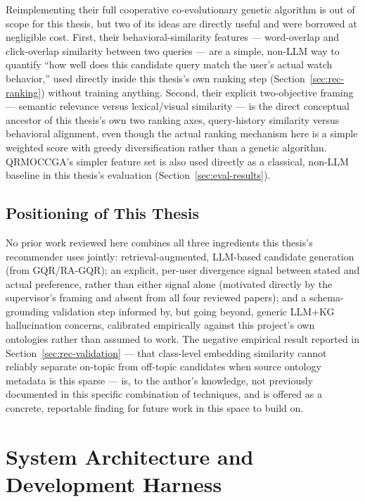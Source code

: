 \documentclass[11pt,a4paper,oneside]{book}
\begin{document}
Reimplementing their full cooperative co-evolutionary genetic algorithm is out of scope for this
thesis, but two of its ideas are directly useful and were borrowed at negligible cost. First, their
behavioral-similarity features --- word-overlap and click-overlap similarity between two queries ---
are a simple, non-LLM way to quantify ``how well does this candidate query match the user's actual
watch behavior,'' used directly inside this thesis's own ranking step
(Section~\ref{sec:rec-ranking}) without training anything. Second, their explicit two-objective
framing --- semantic relevance versus lexical/visual similarity --- is the direct conceptual
ancestor of this thesis's own two ranking axes, query-history similarity versus behavioral
alignment, even though the actual ranking mechanism here is a simple weighted score with greedy
diversification rather than a genetic algorithm. QRMOCCGA's simpler feature set is also used
directly as a classical, non-LLM baseline in this thesis's evaluation (Section~\ref{sec:eval-results}).

\section{Positioning of This Thesis}
\label{sec:rel-position}

No prior work reviewed here combines all three ingredients this thesis's recommender uses jointly:
retrieval-augmented, LLM-based candidate generation (from GQR/RA-GQR); an explicit, per-user
divergence signal between stated and actual preference, rather than either signal alone (motivated
directly by the supervisor's framing and absent from all four reviewed papers); and a
schema-grounding validation step informed by, but going beyond, generic LLM+KG hallucination
concerns, calibrated empirically against this project's own ontologies rather than assumed to work.
The negative empirical result reported in Section~\ref{sec:rec-validation} --- that class-level
embedding similarity cannot reliably separate on-topic from off-topic candidates when source
ontology metadata is this sparse --- is, to the author's knowledge, not previously documented in
this specific combination of techniques, and is offered as a concrete, reportable finding for
future work in this space to build on.

\chapter{System Architecture and Development Harness}
\label{ch:arch}
\end{document}
